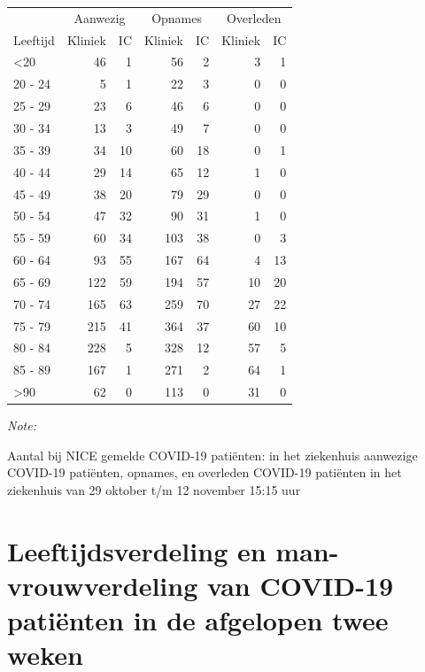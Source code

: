 \documentclass[
  english,
  man,floatsintext]{apa6}
\begin{document}
\begin{table}
\centering\begingroup\fontsize{10}{12}\selectfont

\begin{threeparttable}
\begin{tabular}{lrrrrrr}
\toprule
\multicolumn{1}{c}{ } & \multicolumn{2}{c}{Aanwezig} & \multicolumn{2}{c}{Opnames} & \multicolumn{2}{c}{Overleden} \\
\cmidrule(l{3pt}r{3pt}){2-3} \cmidrule(l{3pt}r{3pt}){4-5} \cmidrule(l{3pt}r{3pt}){6-7}
Leeftijd & Kliniek & IC & Kliniek & IC & Kliniek & IC\\
\midrule
<20 & 46 & 1 & 56 & 2 & 3 & 1\\
20 - 24 & 5 & 1 & 22 & 3 & 0 & 0\\
25 - 29 & 23 & 6 & 46 & 6 & 0 & 0\\
30 - 34 & 13 & 3 & 49 & 7 & 0 & 0\\
35 - 39 & 34 & 10 & 60 & 18 & 0 & 1\\
40 - 44 & 29 & 14 & 65 & 12 & 1 & 0\\
45 - 49 & 38 & 20 & 79 & 29 & 0 & 0\\
50 - 54 & 47 & 32 & 90 & 31 & 1 & 0\\
55 - 59 & 60 & 34 & 103 & 38 & 0 & 3\\
60 - 64 & 93 & 55 & 167 & 64 & 4 & 13\\
65 - 69 & 122 & 59 & 194 & 57 & 10 & 20\\
70 - 74 & 165 & 63 & 259 & 70 & 27 & 22\\
75 - 79 & 215 & 41 & 364 & 37 & 60 & 10\\
80 - 84 & 228 & 5 & 328 & 12 & 57 & 5\\
85 - 89 & 167 & 1 & 271 & 2 & 64 & 1\\
>90 & 62 & 0 & 113 & 0 & 31 & 0\\
\bottomrule
\end{tabular}
\begin{tablenotes}
\item \textit{Note: } 
\item Aantal bij NICE gemelde COVID-19 patiënten: in het ziekenhuis aanwezige COVID-19 patiënten, opnames, en overleden COVID-19 patiënten in het ziekenhuis van 29 oktober t/m 12 november 15:15 uur
\end{tablenotes}
\end{threeparttable}
\endgroup{}
\end{table}

\newpage

\hypertarget{leeftijdsverdeling-en-man-vrouwverdeling-van-covid-19-patiuxebnten-in-de-afgelopen-twee-weken}{%
\section{Leeftijdsverdeling en man-vrouwverdeling van COVID-19 patiënten in de afgelopen twee weken}\label{leeftijdsverdeling-en-man-vrouwverdeling-van-covid-19-patiuxebnten-in-de-afgelopen-twee-weken}}
\end{document}

